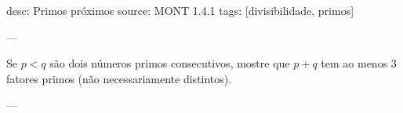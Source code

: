 desc: Primos próximos
source:  MONT 1.4.1
tags:  [divisibilidade, primos]

---

Se $p < q$ são dois números primos consecutivos, mostre que $p + q$ tem ao menos $3$ fatores primos (não necessariamente distintos).

---
